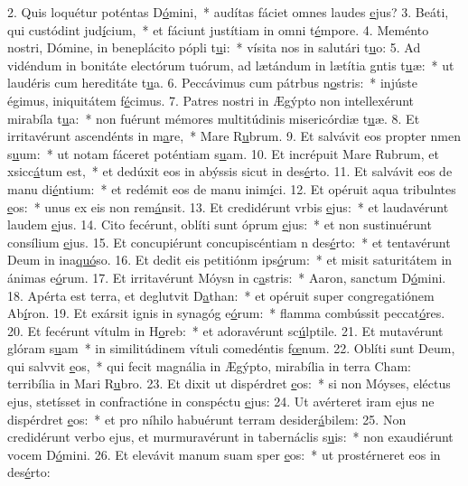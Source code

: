 2. Quis loquétur poténtas D\uline{ó}mini,~* audítas fáciet omnes laudes \uline{e}jus?
3. Beáti, qui custódint jud\uline{í}cium,~* et fáciunt justítiam in omni t\uline{é}mpore.
4. Meménto nostri, Dómine, in beneplácito pópli t\uline{u}i:~* vísita nos in salutári t\uline{u}o:
5. Ad vidéndum in bonitáte electórum tuórum, ad lætándum in lætítia gntis t\uline{u}æ:~* ut laudéris cum hereditáte t\uline{u}a.
6. Peccávimus cum pátrbus n\uline{o}stris:~* injúste égimus, iniquitátem f\uline{é}cimus.
7. Patres nostri in Ægýpto non intellexérunt mirabíla t\uline{u}a:~* non fuérunt mémores multitúdinis misericórdiæ t\uline{u}æ.
8. Et irritavérunt ascendénts in m\uline{a}re,~* Mare R\uline{u}brum.
9. Et salvávit eos propter nmen s\uline{u}um:~* ut notam fáceret poténtiam s\uline{u}am.
10. Et incrépuit Mare Rubrum, et xsicc\uline{á}tum est,~* et dedúxit eos in abýssis sicut in des\uline{é}rto.
11. Et salvávit eos de manu di\uline{é}ntium:~* et redémit eos de manu inim\uline{í}ci.
12. Et opéruit aqua tribulntes \uline{e}os:~* unus ex eis non rem\uline{á}nsit.
13. Et credidérunt vrbis \uline{e}jus:~* et laudavérunt laudem \uline{e}jus.
14. Cito fecérunt, oblíti sunt óprum \uline{e}jus:~* et non sustinuérunt consílium \uline{e}jus.
15. Et concupiérunt concupiscéntiam n des\uline{é}rto:~* et tentavérunt Deum in ina\uline{quó}so.
16. Et dedit eis petitiónm ips\uline{ó}rum:~* et misit saturitátem in ánimas e\uline{ó}rum.
17. Et irritavérunt Móysn in c\uline{a}stris:~* Aaron, sanctum D\uline{ó}mini.
18. Apérta est terra, et deglutvit D\uline{a}than:~* et opéruit super congregatiónem Ab\uline{í}ron.
19. Et exársit ignis in synagóg e\uline{ó}rum:~* flamma combússit peccat\uline{ó}res.
20. Et fecérunt vítulm in H\uline{o}reb:~* et adoravérunt sc\uline{ú}lptile.
21. Et mutavérunt glóram s\uline{u}am~* in similitúdinem vítuli comedéntis f\uline{œ}num.
22. Oblíti sunt Deum, qui salvvit \uline{e}os,~* qui fecit magnália in Ægýpto, mirabília in terra Cham: terribília in Mari R\uline{u}bro.
23. Et dixit ut dispérdret \uline{e}os:~* si non Móyses, eléctus ejus, stetísset in confractióne in conspéctu \uline{e}jus:
24. Ut avérteret iram ejus ne dispérdret \uline{e}os:~* et pro níhilo habuérunt terram desider\uline{á}bilem:
25. Non credidérunt verbo ejus, et murmuravérunt in tabernáclis s\uline{u}is:~* non exaudiérunt vocem D\uline{ó}mini.
26. Et elevávit manum suam sper \uline{e}os:~* ut prostérneret eos in des\uline{é}rto:
